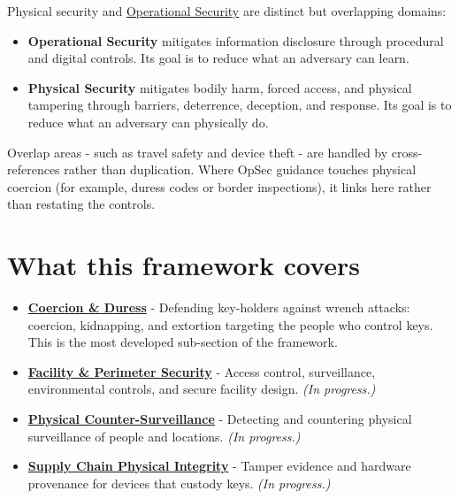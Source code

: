 Physical security and \href{https://frameworks.securityalliance.dev/opsec/overview}{Operational Security} are distinct but overlapping domains:

\begin{itemize}
\tightlist
\item
  \textbf{Operational Security} mitigates information disclosure through procedural and digital controls. Its goal is to reduce what an adversary can learn.
\item
  \textbf{Physical Security} mitigates bodily harm, forced access, and physical tampering through barriers, deterrence, deception, and response. Its goal is to reduce what an adversary can physically do.
\end{itemize}

Overlap areas - such as travel safety and device theft - are handled by cross-references rather than duplication. Where OpSec guidance touches physical coercion (for example, duress codes or border inspections), it links here rather than restating the controls.

\section{What this framework covers}\label{what-this-framework-covers}

\begin{itemize}
\tightlist
\item
  \href{https://frameworks.securityalliance.dev/physical-security/coercion-and-duress/overview}{\textbf{Coercion \& Duress}} - Defending key-holders against wrench attacks: coercion, kidnapping, and extortion targeting the people who control keys. This is the most developed sub-section of the framework.
\item
  \href{https://frameworks.securityalliance.dev/physical-security/facility-and-perimeter/overview}{\textbf{Facility \& Perimeter Security}} - Access control, surveillance, environmental controls, and secure facility design. \emph{(In progress.)}
\item
  \href{https://frameworks.securityalliance.dev/physical-security/physical-counter-surveillance/overview}{\textbf{Physical Counter-Surveillance}} - Detecting and countering physical surveillance of people and locations. \emph{(In progress.)}
\item
  \href{https://frameworks.securityalliance.dev/physical-security/supply-chain-physical-integrity/overview}{\textbf{Supply Chain Physical Integrity}} - Tamper evidence and hardware provenance for devices that custody keys. \emph{(In progress.)}
\end{itemize}

